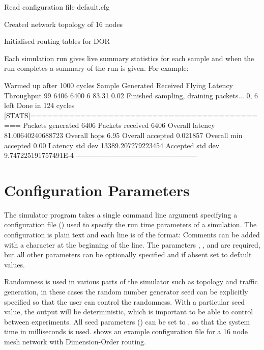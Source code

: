 \documentclass[10pt,a4paper]{article}
\begin{document}
\begin{egcode}
Read configuration file default.cfg

Created network topology of 16 nodes

Initialised routing tables for DOR
\end{egcode}

\noindent
Each simulation run gives live summary statistics for each sample and
when the run completes a summary of the run is given. For example:

\begin{egcode}
Warmed up after 1000 cycles
Sample      Generated   Received    Flying      Latency     Throughput  
99          6406        6400        6           83.31       0.02        
Finished sampling, draining packets...
0, 6 left
Done in 124 cycles
[STATS]============================================
Packets generated    6406
Packets received     6406
Overall latency      81.00640240688723
Overall hops         6.95
Overall accepted     0.021857
Overall min accepted 0.00
Latency std dev      13389.207279223454
Accepted std dev      9.747225191757491E-4
---------------------------------------------------
\end{egcode}

\section{Configuration Parameters}

The simulator program takes a single command line argument specifying a
configuration file () used to specify the run time parameters of a
simulation. The configuration is plain text and each line is of the format:
 Comments can be added with
a \ttt{\#} character at the beginning of the line. The parameters ,
,  and  are required, but all
other parameters can be optionally specified and if absent set to default
values.

Randomness is used in various parts of the simulator such as topology and
traffic generation, in these cases the random number generator seed can be
explicitly specified so that the user can control the randomness. With a
particular seed value, the output will be deterministic, which is important to
be able to control between experiments. All seed parameters () can
be set to , so that the system time in milliseconds is used.
 shows an example configuration file for a 16 node mesh network with
Dimension-Order routing.
\end{document}
